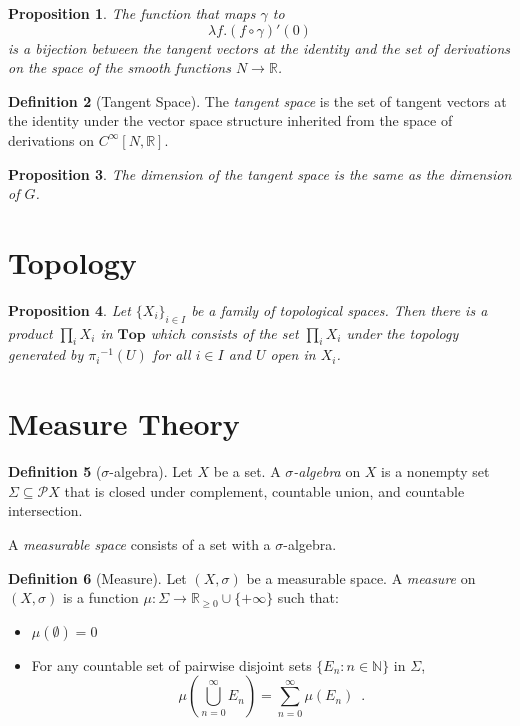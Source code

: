 \documentclass{book}
\newtheorem{prop}{Proposition}[chapter]
\theoremstyle{definition}
\newtheorem{df}[prop]{Definition}
\newcommand{\inv}[1]{\ensuremath{{#1}^{-1}}}
\begin{document}
\begin{prop}
The function that maps $\gamma$ to
\[ \lambda f. (f \circ \gamma)'(0) \]
 is a bijection between the tangent vectors at the identity and the set of derivations on the space of the smooth functions $N \rightarrow \mathbb{R}$.
 \end{prop}
 
 
\begin{df}[Tangent Space]
The \emph{tangent space} is the set of tangent vectors at the identity under the vector space structure inherited from the space of derivations on $C^\infty[N, \mathbb{R}]$.
\end{df}

\begin{prop}
The dimension of the tangent space is the same as the dimension of $G$.
\end{prop}


\part{Topology}

\begin{prop}
Let $\{ X_i \}_{i \in I}$ be a family of topological spaces. Then there is a product $\prod_i X_i$ in $\mathbf{Top}$ which consists of the set $\prod_i X_i$ under the topology generated by $\inv{\pi_i}(U)$ for all $i \in I$ and $U$ open in $X_i$.
\end{prop}

\part{Measure Theory}

\begin{df}[$\sigma$-algebra]
Let $X$ be a set. A \emph{$\sigma$-algebra} on $X$ is a nonempty set $\Sigma \subseteq \mathcal{P} X$ that is closed under complement, countable union, and countable intersection.

A \emph{measurable space} consists of a set with a $\sigma$-algebra.
\end{df}

\begin{df}[Measure]
Let $(X, \sigma)$ be a measurable space. A \emph{measure} on $(X, \sigma)$ is a function $\mu : \Sigma \rightarrow \mathbb{R}_{\geq 0} \cup \{ + \infty \}$ such that:
\begin{itemize}
\item $\mu(\emptyset) = 0$
\item For any countable set of pairwise disjoint sets $\{ E_n : n \in \mathbb{N} \}$ in $\Sigma$,
\[ \mu \left( \bigcup_{n=0}^\infty E_n \right) = \sum_{n=0}^\infty \mu(E_n) \enspace . \]
\end{itemize}
\end{df}
\end{document}
